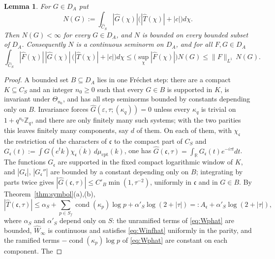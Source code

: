 \documentclass[11pt]{amsart}
\newtheorem{lemma}[theorem]{Lemma}
\theoremstyle{definition}
\theoremstyle{remark}
\newcommand{\R}{\mathbb R}
\newcommand{\Z}{\mathbb Z}
\newcommand{\Th}{\widehat{T}}
\newcommand{\Wh}{\widehat{W}}
\newcommand{\Ch}{\widehat{C}_S}
\newcommand{\DA}{D_A}
\newcommand{\cond}{\operatorname{cond}}
\begin{document}
\begin{lemma}\label{lem:Nseminorm}
For $G\in\DA$ put
\begin{equation}\label{eq:Nsemi}
N(G):=\int_{\Ch}|\widehat G(\chi)|\bigl(|\Th(\chi)|+|c|\bigr)d\chi .
\end{equation}
Then $N(G)<\infty$ for every $G\in\DA$, and $N$ is bounded on every bounded
subset of $\DA$.  Consequently $N$ is a continuous seminorm on $\DA$, and for
all $F,G\in\DA$
\begin{equation}\label{eq:Nineq}
\int_{\Ch}|\widehat F(\chi)|\,|\widehat G(\chi)|\,\bigl(|\Th(\chi)|+|c|\bigr)d\chi
\le\bigl(\sup_{\chi}|\widehat F(\chi)|\bigr)N(G)
\le\lVert F\rVert_{L^{1}}\,N(G).
\end{equation}
\end{lemma}

\begin{proof}
A bounded set $B\subseteq\DA$ lies in one Fr\'echet step: there are a compact
$K\subseteq C_S$ and an integer $n_0\ge0$ such that every $G\in B$ is supported
in $K$, is invariant under $\Theta_{n_0}$, and has all step
seminorms bounded by constants depending only on $B$.  Invariance forces
$\widehat G(\varepsilon,\tau;(\kappa_q))=0$ unless every $\kappa_q$ is trivial
on $1+q^{n_0}\Z_q$, and there are only finitely many such systems; with the two
parities this leaves finitely many components, say $d$ of them.  On each of
them, with $\chi_{\mathfrak c}$ the restriction of the characters of
$\mathfrak c$ to the compact part of $C_S$ and
$G_{\mathfrak c}(t):=\int G(e^{t}k)\overline{\chi_{\mathfrak c}(k)}\,
d\mu_{\mathrm{cpt}}(k)$, one has
$\widehat G(\mathfrak c,\tau)=\int_{\R}G_{\mathfrak c}(t)e^{-i\tau t}dt$.  The
functions $G_{\mathfrak c}$ are supported in the fixed compact logarithmic
window of $K$, and $|G_{\mathfrak c}|$, $|G_{\mathfrak c}''|$ are bounded by a
constant depending only on $B$; integrating by parts twice gives
$|\widehat G(\mathfrak c,\tau)|\le C'_B\min(1,\tau^{-2})$, uniformly in
$\mathfrak c$ and in $G\in B$.  By Theorem~\ref{thm:symbol}(a),(b),
\begin{equation}\label{eq:logbound}
|\Th(\mathfrak c,\tau)|\le\alpha_S+\sum_{p\in S_f}\cond(\kappa_p)\log p
+\alpha'_S\log(2+|\tau|)=:A_{\mathfrak c}+\alpha'_S\log(2+|\tau|),
\end{equation}
where $\alpha_S$ and $\alpha'_S$ depend only on $S$: the unramified terms of
\eqref{eq:Wphat} are bounded, $\Wh_{\infty}$ is continuous and satisfies
\eqref{eq:Winfhat} uniformly in the parity, and the ramified terms
$-\cond(\kappa_p)\log p$ of \eqref{eq:Wphat} are constant on each component.  The

\end{proof}
\end{document}
